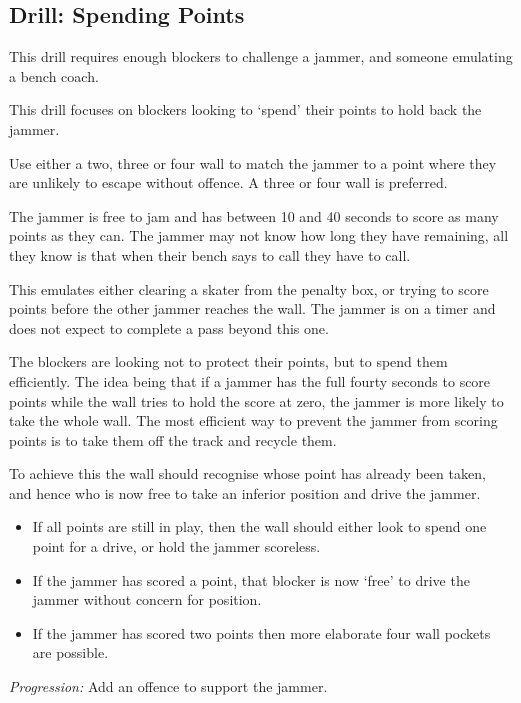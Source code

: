 \subsection*{Drill: Spending Points}
\label{drill:points/spending}

This drill requires enough blockers to challenge a jammer, and someone emulating a bench coach.

This drill focuses on blockers looking to `spend' their points to hold back the jammer.

Use either a two, three or four wall to match the jammer to a point where they are unlikely to escape without offence.
A three or four wall is preferred.

The jammer is free to jam and has between 10 and 40 seconds to score as many points as they can.
The jammer may not know how long they have remaining, all they know is that when their bench says to call they have to call. 


This emulates either clearing a skater from the penalty box, or trying to score points before the other jammer reaches the wall.  
The jammer is on a timer and does not expect to complete a pass beyond this one.

The blockers are looking not to protect their points, but to spend them efficiently. 
The idea being that if a jammer has the full fourty seconds to score points while the wall tries to hold the score at zero, the jammer is more likely to take the whole wall. 
The most efficient way to prevent the jammer from scoring points is to take them off the track and recycle them. 


To achieve this the wall should recognise whose point has already been taken, and hence who is now free to take an inferior position and drive the jammer.

\begin{itemize}
\item If all points are still in play, then the wall should either look to spend one point for a drive, or hold the jammer scoreless. 
\item If the jammer has scored a point, that blocker is now `free' to drive the jammer without concern for position.
\item If the jammer has scored two points then more elaborate four wall pockets are possible.
\end{itemize}


{\it Progression: } Add an offence to support the jammer. 
